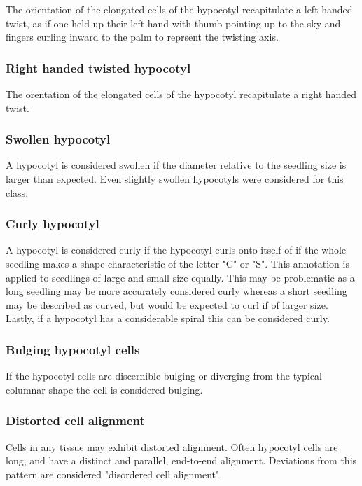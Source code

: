 The orientation of the elongated cells of the hypocotyl recapitulate a left handed twist, as if one held up their left hand with thumb pointing up to the sky and fingers curling inward to the palm to reprsent the twisting axis. %

\subsubsection{Right handed twisted hypocotyl}

The orentation of the elongated cells of the hypocotyl recapitulate a right handed twist. %

\subsubsection{Swollen hypocotyl}

A hypocotyl is considered swollen if the diameter relative to the seedling size is larger than expected. Even slightly swollen hypocotyls were considered for this class.

\subsubsection{Curly hypocotyl}

A hypocotyl is considered curly if the hypocotyl curls onto itself of if the whole seedling makes a shape characteristic of the letter "C" or "S". This annotation is applied to seedlings of large and small size equally. This may be problematic as a long seedling may be more accurately considered curly whereas a short seedling may be described as curved, but would be expected to curl if of larger size. Lastly, if a hypocotyl has a considerable spiral this can be considered curly.

\subsubsection{Bulging hypocotyl cells}

If the hypocotyl cells are discernible bulging or diverging from the typical columnar shape the cell is considered bulging.

\subsubsection{Distorted cell alignment}

Cells in any tissue may exhibit distorted alignment. Often hypocotyl cells are long, and have a distinct and parallel, end-to-end alignment. Deviations from this pattern are considered "disordered cell alignment".


